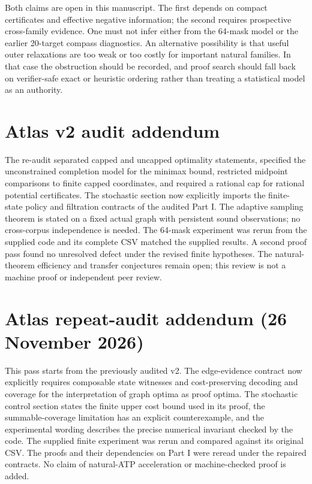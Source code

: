 \documentclass[11pt]{article}
\theoremstyle{definition}\newtheorem{definition}[theorem]{Definition}\newtheorem{example}[theorem]{Example}\newtheorem{conjecture}[theorem]{Conjecture}
\begin{document}
Both claims are open in this manuscript. The first depends on compact certificates and effective negative information; the second requires prospective cross-family evidence. One must not infer either from the 64-mask model or the earlier 20-target compass diagnostics. An alternative possibility is that useful outer relaxations are too weak or too costly for important natural families. In that case the obstruction should be recorded, and proof search should fall back on verifier-safe exact or heuristic ordering rather than treating a statistical model as an authority.
\section*{Atlas v2 audit addendum}
The re-audit separated capped and uncapped optimality statements, specified the unconstrained completion model for the minimax bound, restricted midpoint comparisons to finite capped coordinates, and required a rational cap for rational potential certificates. The stochastic section now explicitly imports the finite-state policy and filtration contracts of the audited Part I. The adaptive sampling theorem is stated on a fixed actual graph with persistent sound observations; no cross-corpus independence is needed. The 64-mask experiment was rerun from the supplied code and its complete CSV matched the supplied results. A second proof pass found no unresolved defect under the revised finite hypotheses. The natural-theorem efficiency and transfer conjectures remain open; this review is not a machine proof or independent peer review.
\section*{Atlas repeat-audit addendum (26 November 2026)}
This pass starts from the previously audited v2. The edge-evidence contract now explicitly requires composable state witnesses and cost-preserving decoding and coverage for the interpretation of graph optima as proof optima. The stochastic control section states the finite upper cost bound used in its proof, the summable-coverage limitation has an explicit counterexample, and the experimental wording describes the precise numerical invariant checked by the code. The supplied finite experiment was rerun and compared against its original CSV. The proofs and their dependencies on Part I were reread under the repaired contracts. No claim of natural-ATP acceleration or machine-checked proof is added.
\end{document}
